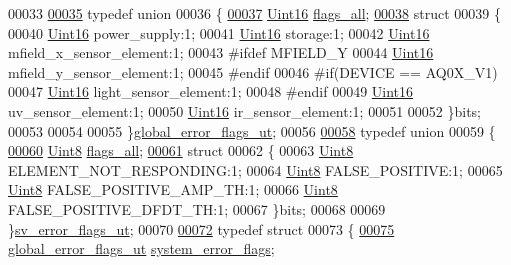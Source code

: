 \begin{DoxyCode}
00033 
\hypertarget{a00003_source_l00035}{}\hyperlink{a00003}{00035} \textcolor{keyword}{typedef} \textcolor{keyword}{union}
00036 \{
\hypertarget{a00003_source_l00037}{}\hyperlink{a00003_ab5bcfbc3ba785f199fd15527b12699f5}{00037}     \hyperlink{a00001_aae7407b021d43f7193a81a58cfb3e297}{Uint16} \hyperlink{a00003_ab5bcfbc3ba785f199fd15527b12699f5}{flags\_all};
\hypertarget{a00003_source_l00038}{}\hyperlink{a00003}{00038}     \textcolor{keyword}{struct}
00039     \{
00040         \hyperlink{a00001_aae7407b021d43f7193a81a58cfb3e297}{Uint16} power\_supply:1;
00041         \hyperlink{a00001_aae7407b021d43f7193a81a58cfb3e297}{Uint16} storage:1;
00042         \hyperlink{a00001_aae7407b021d43f7193a81a58cfb3e297}{Uint16} mfield\_x\_sensor\_element:1;
00043 \textcolor{preprocessor}{#ifdef MFIELD\_Y}
00044         \hyperlink{a00001_aae7407b021d43f7193a81a58cfb3e297}{Uint16} mfield\_y\_sensor\_element:1;
00045 \textcolor{preprocessor}{#endif}
00046 \textcolor{preprocessor}{#if(DEVICE == AQ0X\_V1)}
00047         \hyperlink{a00001_aae7407b021d43f7193a81a58cfb3e297}{Uint16} light\_sensor\_element:1;
00048 \textcolor{preprocessor}{#endif}
00049         \hyperlink{a00001_aae7407b021d43f7193a81a58cfb3e297}{Uint16} uv\_sensor\_element:1;
00050         \hyperlink{a00001_aae7407b021d43f7193a81a58cfb3e297}{Uint16} ir\_sensor\_element:1;
00051 
00052     \}bits;
00053 
00054 
00055 \}\hyperlink{a00003_db/df8/a00076}{global\_error\_flags\_ut};
00056 
\hypertarget{a00003_source_l00058}{}\hyperlink{a00003}{00058} \textcolor{keyword}{typedef} \textcolor{keyword}{union}
00059 \{
\hypertarget{a00003_source_l00060}{}\hyperlink{a00003_a0f01d49aa613ecb0f5a785a154c7f626}{00060}     \hyperlink{a00001_a979e3e23b9a449e69ab6a8a83b6042f8}{Uint8} \hyperlink{a00003_a0f01d49aa613ecb0f5a785a154c7f626}{flags\_all};
\hypertarget{a00003_source_l00061}{}\hyperlink{a00003}{00061}     \textcolor{keyword}{struct}
00062     \{
00063         \hyperlink{a00001_a979e3e23b9a449e69ab6a8a83b6042f8}{Uint8} ELEMENT\_NOT\_RESPONDING:1;
00064         \hyperlink{a00001_a979e3e23b9a449e69ab6a8a83b6042f8}{Uint8} FALSE\_POSITIVE:1;
00065         \hyperlink{a00001_a979e3e23b9a449e69ab6a8a83b6042f8}{Uint8} FALSE\_POSITIVE\_AMP\_TH:1;
00066         \hyperlink{a00001_a979e3e23b9a449e69ab6a8a83b6042f8}{Uint8} FALSE\_POSITIVE\_DFDT\_TH:1;
00067     \}bits;
00068 
00069 \}\hyperlink{a00003_d2/df5/a00137}{sv\_error\_flags\_ut};
00070 
\hypertarget{a00003_source_l00072}{}\hyperlink{a00003}{00072} \textcolor{keyword}{typedef} \textcolor{keyword}{struct}
00073 \{
\hypertarget{a00003_source_l00075}{}\hyperlink{a00003_a7294ffc170c17b91f442d03081cb69fe}{00075}   \hyperlink{a00003_db/df8/a00076}{global\_error\_flags\_ut}     \hyperlink{a00003_a7294ffc170c17b91f442d03081cb69fe}{system\_error\_flags};

\end{DoxyCode}
